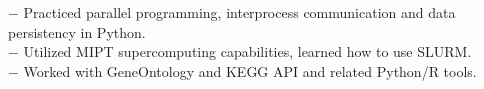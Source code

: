\documentclass[11pt]{res}
\begin{document}
\begin{resume}
$ - $ Practiced parallel programming, interprocess communication and data persistency in Python.\\ 
$ - $ Utilized MIPT supercomputing capabilities, learned how to use SLURM.\\
$ - $ Worked with GeneOntology and KEGG API and related Python/R tools.\vspace{0.2em}


\end{resume}
\end{document}
